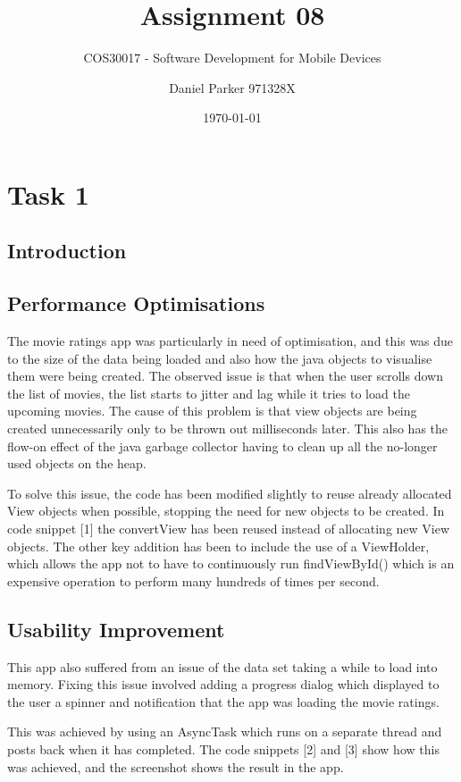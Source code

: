 \documentclass[11pt,english,numbers=endperiod,parskip=half]{scrartcl}
\title{Assignment 08}
\subtitle{COS30017 - Software Development for Mobile Devices}
\author{Daniel Parker 971328X}
\date{\today}
\begin{document}
\maketitle
\thispagestyle{empty}

\section{Task 1}
\subsection{Introduction}
\subsection{Performance Optimisations}
The movie ratings app was particularly in need of optimisation, and this was due
to the size of the data being loaded and also how the java objects to visualise
them were being created. The observed issue is that when the user scrolls down
the list of movies, the list starts to jitter and lag while it tries to load the
upcoming movies. The cause of this problem is that view objects are being created
unnecessarily only to be thrown out milliseconds later. This also has the flow-on
effect of the java garbage collector having to clean up all the no-longer used
objects on the heap.

To solve this issue, the code has been modified slightly to reuse already allocated
View objects when possible, stopping the need for new objects to be created. In
code snippet [1] the convertView has been reused instead of allocating new View
objects. The other key addition has been to include the use of a ViewHolder, which
allows the app not to have to continuously run findViewById() which is an
expensive operation to perform many hundreds of times per second.



\subsection{Usability Improvement}
This app also suffered from an issue of the data set taking a while to load into
memory. Fixing this issue involved adding a progress dialog which displayed to
the user a spinner and notification that the app was loading the movie ratings.

This was achieved by using an AsyncTask which runs on a separate thread and posts
back when it has completed. The code snippets [2] and [3] show how this was achieved,
and the screenshot shows the result in the app.
\end{document}
